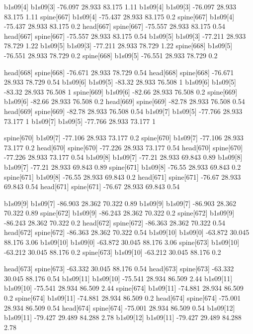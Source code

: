 b1s09[4]    b1s09[3]    -76.097    28.933    83.175    1.11
b1s09[4]    b1s09[3]    -76.097    28.933    83.175    1.11
spine[667]    b1s09[4]    -75.437    28.933    83.175    0.2
spine[667]    b1s09[4]    -75.437    28.933    83.175    0.2
head[667]    spine[667]    -75.557    28.933    83.175    0.54
head[667]    spine[667]    -75.557    28.933    83.175    0.54
b1s09[5]    b1s09[3]    -77.211    28.933    78.729    1.22
b1s09[5]    b1s09[3]    -77.211    28.933    78.729    1.22
spine[668]    b1s09[5]    -76.551    28.933    78.729    0.2
spine[668]    b1s09[5]    -76.551    28.933    78.729    0.2


head[668]    spine[668]    -76.671    28.933    78.729    0.54
head[668]    spine[668]    -76.671    28.933    78.729    0.54
b1s09[6]    b1s09[5]    -83.32    28.933    76.508    1
b1s09[6]    b1s09[5]    -83.32    28.933    76.508    1
spine[669]    b1s09[6]    -82.66    28.933    76.508    0.2
spine[669]    b1s09[6]    -82.66    28.933    76.508    0.2
head[669]    spine[669]    -82.78    28.933    76.508    0.54
head[669]    spine[669]    -82.78    28.933    76.508    0.54
b1s09[7]    b1s09[5]    -77.766    28.933    73.177    1
b1s09[7]    b1s09[5]    -77.766    28.933    73.177    1


spine[670]    b1s09[7]    -77.106    28.933    73.177    0.2
spine[670]    b1s09[7]    -77.106    28.933    73.177    0.2
head[670]    spine[670]    -77.226    28.933    73.177    0.54
head[670]    spine[670]    -77.226    28.933    73.177    0.54
b1s09[8]    b1s09[7]    -77.21    28.933    69.843    0.89
b1s09[8]    b1s09[7]    -77.21    28.933    69.843    0.89
spine[671]    b1s09[8]    -76.55    28.933    69.843    0.2
spine[671]    b1s09[8]    -76.55    28.933    69.843    0.2
head[671]    spine[671]    -76.67    28.933    69.843    0.54
head[671]    spine[671]    -76.67    28.933    69.843    0.54


b1s09[9]    b1s09[7]    -86.903    28.362    70.322    0.89
b1s09[9]    b1s09[7]    -86.903    28.362    70.322    0.89
spine[672]    b1s09[9]    -86.243    28.362    70.322    0.2
spine[672]    b1s09[9]    -86.243    28.362    70.322    0.2
head[672]    spine[672]    -86.363    28.362    70.322    0.54
head[672]    spine[672]    -86.363    28.362    70.322    0.54
b1s09[10]    b1s09[0]    -63.872    30.045    88.176    3.06
b1s09[10]    b1s09[0]    -63.872    30.045    88.176    3.06
spine[673]    b1s09[10]    -63.212    30.045    88.176    0.2
spine[673]    b1s09[10]    -63.212    30.045    88.176    0.2


head[673]    spine[673]    -63.332    30.045    88.176    0.54
head[673]    spine[673]    -63.332    30.045    88.176    0.54
b1s09[11]    b1s09[10]    -75.541    28.934    86.509    2.44
b1s09[11]    b1s09[10]    -75.541    28.934    86.509    2.44
spine[674]    b1s09[11]    -74.881    28.934    86.509    0.2
spine[674]    b1s09[11]    -74.881    28.934    86.509    0.2
head[674]    spine[674]    -75.001    28.934    86.509    0.54
head[674]    spine[674]    -75.001    28.934    86.509    0.54
b1s09[12]    b1s09[11]    -79.427    29.489    84.288    2.78
b1s09[12]    b1s09[11]    -79.427    29.489    84.288    2.78



